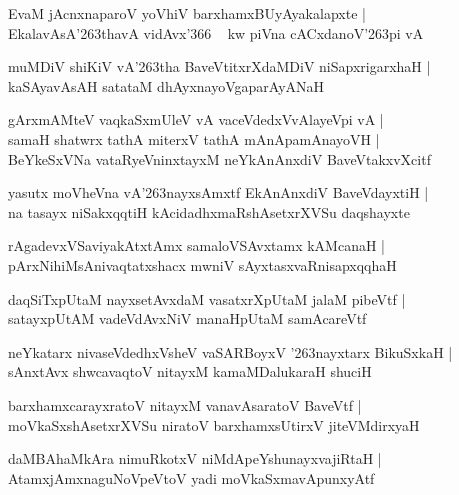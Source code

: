 \documentclass[twoside,12pt,openright]{book}
\def\S{\char'263}
\newcounter{shloka}[chapter]
\begin{document}
\begin{shloka}
EvaM jAcnxnaparoV yoVhiV barxhamxBUyAyakalapxte |\\
EkalavAsA\S thavA vidAvx\char'366 ~ kw piVna cACxdanoV\S pi vA 
\end{shloka}

\begin{shloka}
muMDiV shiKiV vA\S tha BaveVtitxrXdaMDiV niSapxrigarxhaH |\\
kaSAyavAsAH satataM dhAyxnayoVgaparAyANaH  
\end{shloka}

\begin{shloka}
gArxmAMteV vaqkaSxmUleV vA vaceVdedxVvAlayeVpi vA |\\
samaH shatwrx tathA miterxV tathA mAnApamAnayoVH |\\
BeYkeSxVNa vataRyeVninxtayxM neYkAnAnxdiV BaveVtakxvXcitf 
\end{shloka}

\begin{shloka}
yasutx moVheVna vA\S nayxsAmxtf EkAnAnxdiV BaveVdayxtiH |\\
na tasayx niSakxqqtiH kAcidadhxmaRshAsetxrXVSu daqshayxte
\end{shloka}

\begin{shloka}
rAgadevxVSaviyakAtxtAmx samaloVSAvxtamx kAMcanaH |\\
pArxNihiMsAnivaqtatxshacx mwniV sAyxtasxvaRnisapxqqhaH 
\end{shloka}

\begin{shloka}
daqSiTxpUtaM nayxsetAvxdaM vasatxrXpUtaM jalaM pibeVtf |\\
satayxpUtAM vadeVdAvxNiV manaHpUtaM samAcareVtf 
\end{shloka}

\begin{shloka}neYkatarx nivaseVdedhxVsheV vaSARBoyxV \S nayxtarx BikuSxkaH |\\
sAnxtAvx shwcavaqtoV nitayxM kamaMDalukaraH shuciH
\end{shloka}

\begin{shloka}
barxhamxcarayxratoV nitayxM vanavAsaratoV BaveVtf |\\
moVkaSxshAsetxrXVSu niratoV barxhamxsUtirxV jiteVMdirxyaH 
\end{shloka}

\begin{shloka}
daMBAhaMkAra nimuRkotxV niMdApeYshunayxvajiRtaH |\\
AtamxjAmxnaguNoVpeVtoV yadi moVkaSxmavApunxyAtf
\end{shloka}
\end{document}
